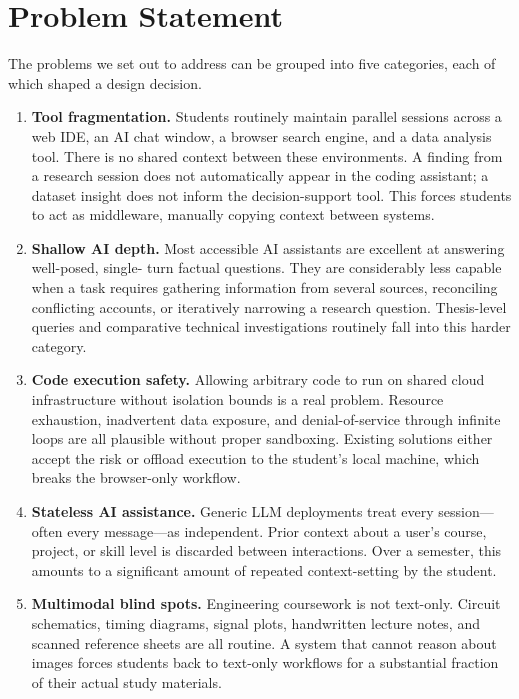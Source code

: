 \section{Problem Statement}
\label{sec:problem}

The problems we set out to address can be grouped into five categories, each of
which shaped a design decision.

\begin{enumerate}
    \item \textbf{Tool fragmentation.}
    Students routinely maintain parallel sessions across a web IDE, an AI chat
    window, a browser search engine, and a data analysis tool. There is no
    shared context between these environments. A finding from a research session
    does not automatically appear in the coding assistant; a dataset insight does
    not inform the decision-support tool. This forces students to act as
    middleware, manually copying context between systems.

    \item \textbf{Shallow AI depth.}
    Most accessible AI assistants are excellent at answering well-posed, single-
    turn factual questions. They are considerably less capable when a task
    requires gathering information from several sources, reconciling conflicting
    accounts, or iteratively narrowing a research question. Thesis-level queries
    and comparative technical investigations routinely fall into this harder
    category.

    \item \textbf{Code execution safety.}
    Allowing arbitrary code to run on shared cloud infrastructure without
    isolation bounds is a real problem. Resource exhaustion, inadvertent data
    exposure, and denial-of-service through infinite loops are all plausible
    without proper sandboxing. Existing solutions either accept the risk or
    offload execution to the student's local machine, which breaks the
    browser-only workflow.

    \item \textbf{Stateless AI assistance.}
    Generic LLM deployments treat every session---often every message---as
    independent. Prior context about a user's course, project, or skill level
    is discarded between interactions. Over a semester, this amounts to a
    significant amount of repeated context-setting by the student.

    \item \textbf{Multimodal blind spots.}
    Engineering coursework is not text-only. Circuit schematics, timing
    diagrams, signal plots, handwritten lecture notes, and scanned reference
    sheets are all routine. A system that cannot reason about images forces
    students back to text-only workflows for a substantial fraction of their
    actual study materials.
\end{enumerate}

